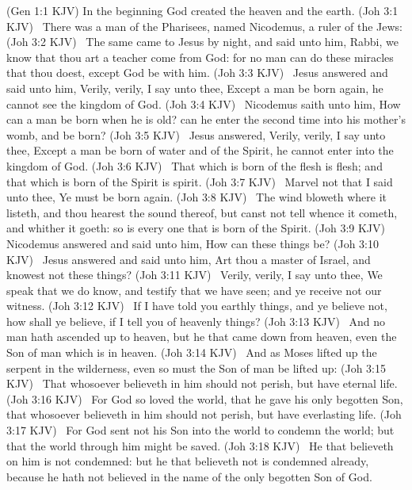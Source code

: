 \documentclass{article}
\begin{document}
\begin{declareBVs*}
\BV(Gen 1:1 KJV) In the beginning God created the heaven and the earth.\null
%
\BV(Joh 3:1 KJV)  There was a man of the Pharisees, named Nicodemus, a ruler of the Jews:\null
\BV(Joh 3:2 KJV)  The same came to Jesus by night, and said unto him, Rabbi, we know that thou art a teacher come from God: for no man can do these miracles that thou doest, except God be with him.\null
\BV(Joh 3:3 KJV)  Jesus answered and said unto him, Verily, verily, I say unto thee, Except a man be born again, he cannot see the kingdom of God.\null
\BV(Joh 3:4 KJV)  Nicodemus saith unto him, How can a man be born when he is old? can he enter the second time into his mother's womb, and be born?\null
\BV(Joh 3:5 KJV)  Jesus answered, Verily, verily, I say unto thee, Except a man be born of water and of the Spirit, he cannot enter into the kingdom of God.\null
\BV(Joh 3:6 KJV)  That which is born of the flesh is flesh; and that which is born of the Spirit is spirit.\null
\BV(Joh 3:7 KJV)  Marvel not that I said unto thee, Ye must be born again.\null
\BV(Joh 3:8 KJV)  The wind bloweth where it listeth, and thou hearest the sound thereof, but canst not tell whence it cometh, and whither it goeth: so is every one that is born of the Spirit.\null
\BV(Joh 3:9 KJV)  Nicodemus answered and said unto him, How can these things be?\null
\BV(Joh 3:10 KJV)  Jesus answered and said unto him, Art thou a master of Israel, and knowest not these things?\null
\BV(Joh 3:11 KJV)  Verily, verily, I say unto thee, We speak that we do know, and testify that we have seen; and ye receive not our witness.\null
\BV(Joh 3:12 KJV)  If I have told you earthly things, and ye believe not, how shall ye believe, if I tell you of heavenly things?\null
\BV(Joh 3:13 KJV)  And no man hath ascended up to heaven, but he that came down from heaven, even the Son of man which is in heaven.\null
\BV(Joh 3:14 KJV)  And as Moses lifted up the serpent in the wilderness, even so must the Son of man be lifted up:\null
\BV(Joh 3:15 KJV)  That whosoever believeth in him should not perish, but have eternal life.\null
\BV(Joh 3:16 KJV)  For God so loved the world, that he gave his only begotten Son, that whosoever believeth in him should not perish, but have everlasting life.\null
\BV(Joh 3:17 KJV)  For God sent not his Son into the world to condemn the world; but that the world through him might be saved.\null
\BV(Joh 3:18 KJV)  He that believeth on him is not condemned: but he that believeth not is condemned already, because he hath not believed in the name of the only begotten Son of God.\null

\end{declareBVs*}
\end{document}
